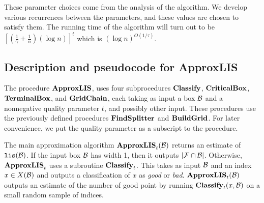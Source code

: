 \documentclass{acmsmall}
\newcommand{\cB}{{\cal B}}
\newcommand{\cF}{{\cal F}}
\newcommand{\lis}{{\tt lis}}
\newcommand{\terminalbox}{{\rm{\bf TerminalBox}}}
\newcommand{\width}{{\bf {\rm  w}}}
\newcommand{\gridprec}{\alpha}
\newcommand{\classify}{{\rm {\bf Classify}}}
\newcommand{\approxlis}{{\rm {\bf ApproxLIS}}}
\newcommand{\critbox}{{\rm {\bf CriticalBox}}}
\newcommand{\findsplitter}{{\rm {\bf FindSplitter}}}
\newcommand{\buildgrid}{{\rm {\bf BuildGrid}}}
\newcommand{\lischain}{{\rm {\bf LIS.Chain}}}
\newcommand{\gridchain}{{\rm {\bf GridChain}}}
\begin{document}
These parameter choices come from the analysis of the algorithm. 
We develop various recurrences between the parameters, and these values are chosen to
satisfy them. 
%
%
%
%
%
The running time of the algorithm will turn out to be  $[(\frac{1}{\gamma}+\frac{1}{\gridprec})(\log n)]^{t}$ which
is $(\log n)^{O(1/\tau)}$. 

\fi

\subsection{Description and pseudocode for \approxlis}
\label{subsec:first overview}

The procedure $\approxlis$, uses four subprocedures $\classify$, $\critbox$, $\terminalbox$, and $\gridchain$,
each taking as input a box $\cB$ and a nonnegative quality parameter $t$,
and possibly other input.  These procedures use 
the previously defined procedures $\findsplitter$ 
and $\buildgrid$. For later convenience, we put the quality parameter as a subscript to the procedure.

The main approximation algorithm $\approxlis_t(\cB)$ returns
an estimate of $\lis(\cB)$. If the
input box $\cB$ has width 1, then it outputs $|\cF \cap \cB|$. Otherwise,
$\approxlis_t$ uses a subroutine 
$\classify_t$. This takes as input $\cB$ 
and an index $x \in X(\cB)$ and outputs a classification of $x$ as {\em good} or {\em bad}.
$\approxlis_t(\cB)$ outputs an estimate of the number of good point by running $\classify_t(x,\cB)$
on a small random sample of indices.
%
\end{document}
